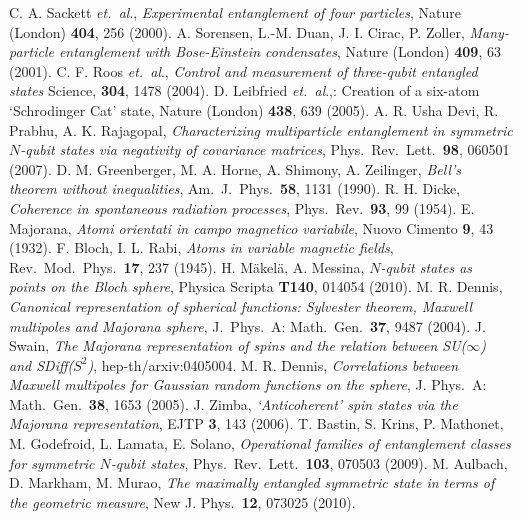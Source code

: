 \renewcommand{\bibname}{References}
\begin{thebibliography}{99}
\itemsep=0pt
 C. A. Sackett \textit{et.\ al}., {\em Experimental entanglement of four particles},  Nature (London) {\bf 404}, 256 (2000).
 A. Sorensen, L.-M. Duan, J. I. Cirac, P. Zoller, {\em Many-particle entanglement with Bose-Einstein condensates}, Nature (London) {\bf 409}, 63 (2001).
 C. F. Roos  \textit{et.\ al}., {\em Control and measurement of three-qubit entangled states} Science, {\bf 304}, 1478 (2004).
 D. Leibfried  \textit{et.\ al}.,: Creation of a six-atom `Schrodinger Cat' state, Nature (London) {\bf{438}}, 639 (2005).
 A. R. Usha Devi, R. Prabhu,  A. K. Rajagopal, {\em Characterizing multiparticle entanglement in symmetric $N$-qubit states
via negativity of covariance matrices}, Phys.\ Rev.\ Lett.\ {\bf 98}, 060501 (2007).  
 D. M. Greenberger, M. A. Horne, A. Shimony, A. Zeilinger, {\em Bell's theorem without inequalities}, Am.\ J.\ Phys.\ {\bf 58}, 1131 (1990).
 R. H. Dicke,  {\em Coherence in spontaneous radiation processes}, Phys.\ Rev.\ {\bf 93}, 99 (1954).
 E. Majorana, {\em Atomi orientati in campo magnetico variabile}, Nuovo Cimento {\bf 9}, 43  (1932). 
 F. Bloch, I. L. Rabi, {\em  Atoms in variable magnetic fields}, Rev.\ Mod.\ Phys.\ {\bf 17}, 237 (1945).
  H. M{\"a}kel{\"a}, A.  Messina, {\em  $N$-qubit states as points on the Bloch sphere}, Physica Scripta {\bf T140}, 014054 (2010). 
 M. R. Dennis, {\em  Canonical representation of spherical functions: Sylvester theorem, Maxwell multipoles and Majorana sphere}, J.\ Phys.\ A: Math.\ Gen.\ {\bf 37}, 9487 (2004).
 J. Swain, {\em The Majorana representation of spins and the relation between SU($\infty$) and SDiff($S^2$)}, hep-th/arxiv:0405004.  
  M. R. Dennis, {\em Correlations between Maxwell multipoles for Gaussian random functions on the sphere}, J. Phys.\ A: Math.\ Gen.\ {\bf 38}, 1653 (2005).
 J. Zimba, {\em `Anticoherent' spin states via the Majorana representation},  EJTP {\bf 3}, 143 (2006).
  T. Bastin, S. Krins, P. Mathonet, M. Godefroid, L. Lamata, E. Solano, {\em Operational families of entanglement classes for symmetric $N$-qubit states}, Phys.\ Rev.\ Lett.\ {\bf 103},  070503 (2009).
 M. Aulbach, D. Markham,  M. Murao, {\em The maximally entangled symmetric state in terms of the geometric measure}, New J. Phys.\ {\bf 12}, 073025 (2010).

\end{thebibliography}

